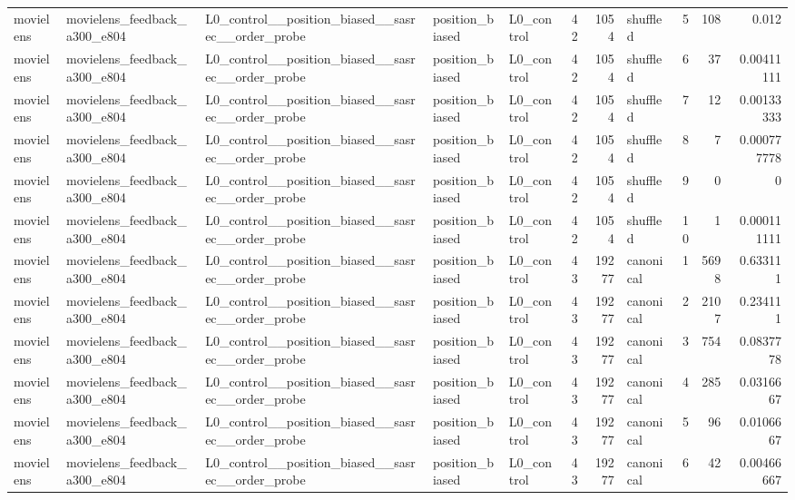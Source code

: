 \begin{table}[htbp!]
\begin{tabular}{lllllrrlrrr}
movielens & movielens\_feedback\_a300\_e804 & L0\_control\_\_position\_biased\_\_sasrec\_\_order\_probe & position\_biased & L0\_control & 42 & 1054 & shuffled & 5 & 108 & 0.012 \\
movielens & movielens\_feedback\_a300\_e804 & L0\_control\_\_position\_biased\_\_sasrec\_\_order\_probe & position\_biased & L0\_control & 42 & 1054 & shuffled & 6 & 37 & 0.00411111 \\
movielens & movielens\_feedback\_a300\_e804 & L0\_control\_\_position\_biased\_\_sasrec\_\_order\_probe & position\_biased & L0\_control & 42 & 1054 & shuffled & 7 & 12 & 0.00133333 \\
movielens & movielens\_feedback\_a300\_e804 & L0\_control\_\_position\_biased\_\_sasrec\_\_order\_probe & position\_biased & L0\_control & 42 & 1054 & shuffled & 8 & 7 & 0.000777778 \\
movielens & movielens\_feedback\_a300\_e804 & L0\_control\_\_position\_biased\_\_sasrec\_\_order\_probe & position\_biased & L0\_control & 42 & 1054 & shuffled & 9 & 0 & 0 \\
movielens & movielens\_feedback\_a300\_e804 & L0\_control\_\_position\_biased\_\_sasrec\_\_order\_probe & position\_biased & L0\_control & 42 & 1054 & shuffled & 10 & 1 & 0.000111111 \\
movielens & movielens\_feedback\_a300\_e804 & L0\_control\_\_position\_biased\_\_sasrec\_\_order\_probe & position\_biased & L0\_control & 43 & 19277 & canonical & 1 & 5698 & 0.633111 \\
movielens & movielens\_feedback\_a300\_e804 & L0\_control\_\_position\_biased\_\_sasrec\_\_order\_probe & position\_biased & L0\_control & 43 & 19277 & canonical & 2 & 2107 & 0.234111 \\
movielens & movielens\_feedback\_a300\_e804 & L0\_control\_\_position\_biased\_\_sasrec\_\_order\_probe & position\_biased & L0\_control & 43 & 19277 & canonical & 3 & 754 & 0.0837778 \\
movielens & movielens\_feedback\_a300\_e804 & L0\_control\_\_position\_biased\_\_sasrec\_\_order\_probe & position\_biased & L0\_control & 43 & 19277 & canonical & 4 & 285 & 0.0316667 \\
movielens & movielens\_feedback\_a300\_e804 & L0\_control\_\_position\_biased\_\_sasrec\_\_order\_probe & position\_biased & L0\_control & 43 & 19277 & canonical & 5 & 96 & 0.0106667 \\
movielens & movielens\_feedback\_a300\_e804 & L0\_control\_\_position\_biased\_\_sasrec\_\_order\_probe & position\_biased & L0\_control & 43 & 19277 & canonical & 6 & 42 & 0.00466667 \\

\end{tabular}
\end{table}
